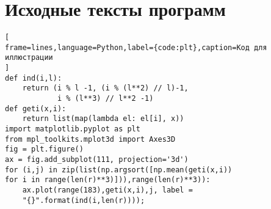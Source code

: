 \chapter{Исходные тексты программ}\label{code}

\begin{lstlisting}[
frame=lines,language=Python,label={code:plt},caption=Код для иллюстрации
]
def ind(i,l):
    return (i % l -1, (i % (l**2) // l)-1,
            i % (l**3) // l**2 -1)	
def geti(x,i):
    return list(map(lambda el: el[i], x))		
import matplotlib.pyplot as plt
from mpl_toolkits.mplot3d import Axes3D
fig = plt.figure()
ax = fig.add_subplot(111, projection='3d')	
for (i,j) in zip(list(np.argsort([np.mean(geti(x,i)) 
for i in range(len(r)**3)])),range(len(r)**3)):
    ax.plot(range(183),geti(x,i),j, label =
    "{}".format(ind(i,len(r))));
\end{lstlisting}
